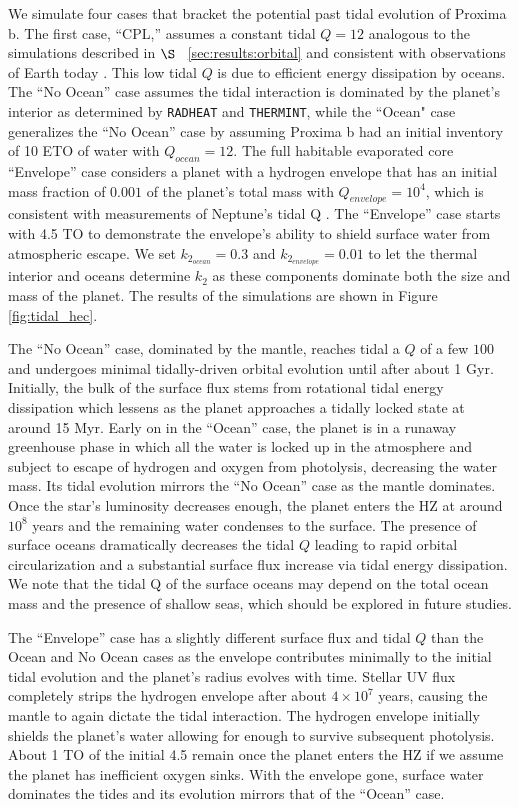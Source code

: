 \documentclass[preprint,12pt]{aastex}
\def\radheat{\texttt{\footnotesize{RADHEAT}}\xspace}
\def\thermint{\texttt{\footnotesize{THERMINT}}\xspace}
\begin{document}
We simulate four cases that bracket the potential
past tidal evolution of Proxima b.  The first case, ``CPL,'' assumes a
constant tidal $Q = 12$ analogous to the simulations described in
$\S$~ \ref{sec:results:orbital} and consistent with observations of
Earth today \citep{Dickey94,Williams78,Yoder95}.  This low tidal $Q$
is due to efficient energy dissipation by oceans.  The ``No Ocean''
case assumes the tidal interaction is dominated by the planet's
interior as determined by \radheat and \thermint, while the ``Ocean"
case generalizes the ``No Ocean'' case by assuming Proxima b had an
initial inventory of 10 ETO of water with $Q_{ocean} = 12$.  The full
habitable evaporated core ``Envelope'' case considers a planet with a
hydrogen envelope that has an initial mass fraction of $0.001$ of the
planet's total mass with $Q_{envelope} = 10^4$, which is consistent
with measurements of Neptune's tidal Q \citep{ZhangHamilton08}.  The
``Envelope'' case starts with 4.5 TO to demonstrate the envelope's
ability to shield surface water from atmospheric escape.  We set
$k_{2_{ocean}} = 0.3$ and $k_{2_{envelope}} = 0.01$ to let the thermal
interior and oceans determine $k_2$ as these components dominate both
the size and mass of the planet. The results of the simulations are
shown in Figure \ref{fig:tidal_hec}.

The ``No Ocean'' case, dominated by the mantle, reaches tidal a $Q$ of a few
$100$ and undergoes minimal tidally-driven orbital evolution until
after about 1 Gyr.  Initially, the bulk of the surface flux stems from
rotational tidal energy dissipation which lessens as the planet
approaches a tidally locked state at around 15 Myr. Early on in the
``Ocean'' case, the planet is in a runaway greenhouse phase in which all
the water is locked up in the atmosphere and subject to escape of
hydrogen and oxygen from photolysis, decreasing the water mass.  Its
tidal evolution mirrors the ``No Ocean'' case as the mantle dominates.
Once the star's luminosity decreases enough, the planet enters the HZ
at around $10^8$ years and the remaining water condenses to the
surface. The presence of surface oceans dramatically decreases the
tidal $Q$ leading to rapid orbital circularization and a substantial
surface flux increase via tidal energy dissipation.
We note that the tidal Q of the surface oceans may depend on the 
total ocean mass and the presence of shallow seas, which should be explored in 
future studies.

The ``Envelope'' case has a slightly different surface flux and tidal $Q$
than the Ocean and No Ocean cases as the envelope contributes
minimally to the initial tidal evolution and the planet's radius
evolves with time.  Stellar UV flux completely strips the
hydrogen envelope after about $4 \times 10^7$ years, causing the mantle
to again dictate the tidal interaction.  The hydrogen envelope
initially shields the planet's water allowing for enough to survive
subsequent photolysis. About 1 TO of the initial 4.5
remain once the planet enters the HZ if we assume the planet has
inefficient oxygen sinks.  With the envelope gone, surface water
dominates the tides and its evolution mirrors that of the ``Ocean'' case.
\end{document}
